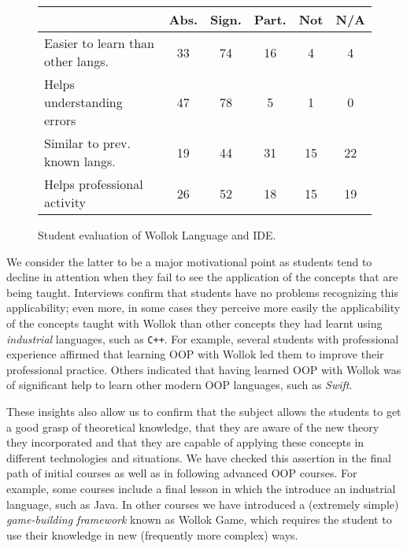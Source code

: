 \begin{figure}[ht]
 \centering
 \footnotesize
 \begin{tabular}{|p{13em}|c|c|c|c|c|}
 	\hline
 	& Abs. & Sign. & Part. & Not & N/A \\
 	\hline
 	Easier to learn than other langs. & 33 & 74 & 16 & 4 & 4 \\
 	Helps understanding errors & 47 & 78 & 5 & 1 & 0 \\
 	Similar to prev. known langs. & 19 & 44 & 31 & 15 & 22 \\
 	Helps professional activity & 26 & 52 & 18 & 15 & 19 \\
 	\hline
 
 \end{tabular}

 \caption{\small Student evaluation of Wollok Language and IDE.}
\label{fig:helloWorld/wollok}
\end{figure}

We consider the latter to be a major motivational point
as students tend to decline in attention 
when they fail to see the application of the concepts that are being taught.
Interviews confirm that students have no problems recognizing this applicability;
even more, in some cases they perceive more easily the applicability of the concepts taught with Wollok 
than other concepts they had learnt using \emph{industrial} languages, such as \texttt{C++}.
For example, several students with professional experience affirmed that 
learning OOP with Wollok led them to improve their professional practice.
Others indicated that having learned OOP with Wollok was of significant help 
to learn other modern OOP languages, such as \emph{Swift}.

These insights also allow us to confirm that the subject allows the students to get a good grasp of theoretical knowledge, 
that they are aware of the new theory they incorporated
and that they are capable of applying these concepts in different technologies and situations.
We have checked this assertion in the final path of initial courses as well as in following advanced OOP courses.
For example, some courses include a final lesson in which the introduce an industrial language, such as Java.
In other courses we have introduced a (extremely simple) \emph{game-building framework} known as Wollok Game,
which requires the student to use their knowledge in new (frequently more complex) ways.


